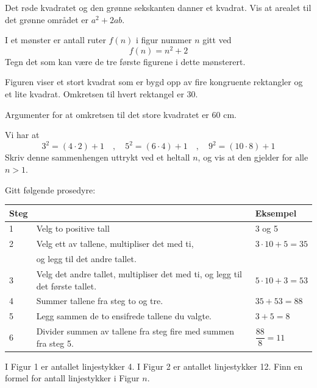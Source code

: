 Det røde kvadratet og den grønne sekskanten danner et kvadrat.
Vis at arealet til det grønne området er $a^2+2ab$.

I et mønster er antall ruter $f(n)$ i figur nummer $n$ gitt ved
\[ f(n)=n^2+2 \]
Tegn det som kan være de tre første figurene i dette mønsterert.

Figuren viser et stort kvadrat som er bygd opp av fire kongruente rektangler og et lite kvadrat.
Omkretsen til hvert rektangel er 30. \os

Argumenter for at omkretsen til det store kvadratet er 60 cm.

Vi har at
\[ 3^2=(4\cdot2)+1\quad,\quad 5^2=(6\cdot4)+1\quad,\quad 9^2=(10\cdot8)+1	 \]
Skriv denne sammenhengen uttrykt ved et heltall $n$, og vis at den gjelder for alle $n>1$.

\newpage
{} \vso
{}

Gitt følgende prosedyre:
\begin{center}
	\begin{tabular}{|m{0.75cm} | m{5cm} | m{3cm}|}
		\hline
		\textbf{Steg}&	&  \textbf{Eksempel} \\
		\hline
		1 & Velg to positive tall & 3 og 5 \\  \hline
		2 & Velg ett av tallene, multipliser det med ti, & $3\cdot10+5=35$\\
		& og legg til det andre tallet. & \\ \hline
		3 & Velg det andre tallet, multipliser det med ti, og legg til det første tallet. & $5\cdot10+3=53$ \\ \hline
		4 & Summer tallene fra steg to og tre. & $35+53=88$\\ \hline
		5 & Legg sammen de to ensifrede tallene du
		valgte. & $3+5=8$ \\ \hline
		6 & Divider summen av tallene fra steg fire med summen fra steg 5. & $\dfrac{88}{8}=11$ \\ \hline
	\end{tabular}
\end{center}
\newpage
{}
I Figur 1 er antallet linjestykker 4. I Figur 2 er antallet linjestykker 12. Finn en formel for antall linjestykker i Figur $n$.



